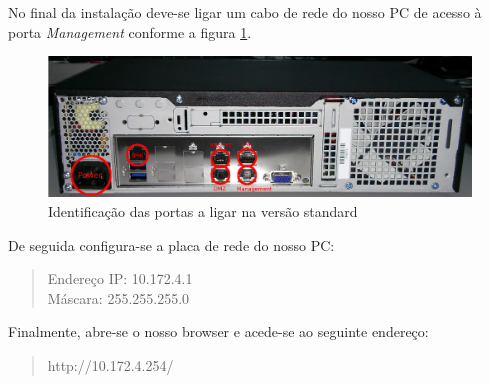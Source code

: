 No final da instalação deve-se ligar um cabo de rede do nosso PC de acesso à porta \emph{Management} conforme a figura \ref{fig:back_standard}.

\begin{figure}[H]
	\begin{center}
	\includegraphics[scale=0.30]{screenshots/appliance_back_g4.jpg}
	\caption{Identificação das portas a ligar na versão standard}
	\label{fig:back_standard}
	\end{center}
\end{figure}

De seguida configura-se a placa de rede do nosso PC:

\begin{quote}
Endereço IP: 10.172.4.1\\
Máscara: 255.255.255.0
\end{quote}

Finalmente, abre-se o nosso browser e acede-se ao seguinte endereço:
\begin{quote}
http://10.172.4.254/
\end{quote}

\pagebreak
